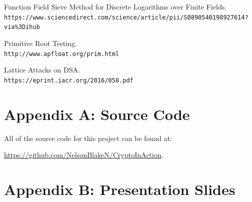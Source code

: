 \documentclass[12pt]{report}
\begin{document}
\begin{thebibliography}{9}
    Function Field Sieve Method for Discrete Logarithms over Finite Fields.\\
    \texttt{https://www.sciencedirect.com/science/article/pii/S0890540198927614?via\%3Dihub}

    Primitive Root Testing.\\
    \texttt{http://www.apfloat.org/prim.html}

    Lattice Attacks on DSA. \\
    \texttt{https://eprint.iacr.org/2016/058.pdf}

\end{thebibliography}

\newpage
\section{Appendix A: Source Code}
All of the source code for this project can be found at:

\href{https://github.com/NelsonBlakeN/CryptoInAction}{https://github.com/NelsonBlakeN/CryptoInAction}.

\newpage
\section{Appendix B: Presentation Slides}
\end{document}
